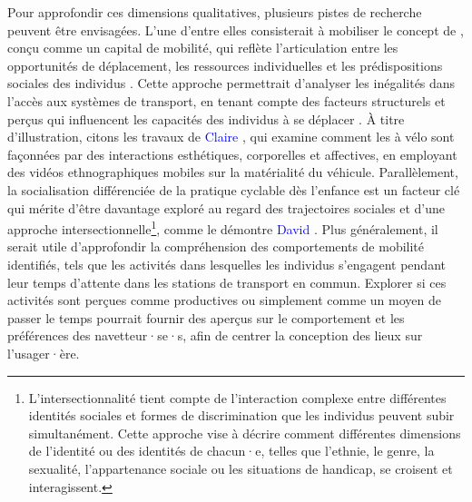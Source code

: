 \begin{refsegment}
Pour approfondir ces dimensions qualitatives, plusieurs pistes de recherche peuvent être envisagées. L'une d'entre elles consisterait à mobiliser le concept de , conçu comme un capital de mobilité, qui reflète l’articulation entre les opportunités de déplacement, les ressources individuelles et les prédispositions sociales des individus \textcolor{blue}{\autocite[750]{kaufmann_motility_2004}}. Cette approche permettrait d’analyser les inégalités dans l’accès aux systèmes de transport, en tenant compte des facteurs structurels et perçus qui influencent les capacités des individus à se déplacer \textcolor{blue}{\autocite[45]{abord_dechatillon_velo_2021}}. À titre d'illustration, citons les travaux de \textcolor{blue}{Claire} \textcolor{blue}{\textcite{pelgrims_gendered_2023}}, qui examine comment les  à vélo sont façonnées par des interactions esthétiques, corporelles et affectives, en employant des vidéos ethnographiques mobiles sur la matérialité du véhicule. Parallèlement, la socialisation différenciée de la pratique cyclable dès l’enfance est un facteur clé qui mérite d’être davantage exploré au regard des trajectoires sociales et d'une approche intersectionnelle\footnote{
    L'intersectionnalité tient compte de l'interaction complexe entre différentes identités sociales et formes de discrimination que les individus peuvent subir simultanément. Cette approche vise à décrire comment différentes dimensions de l'identité ou des identités de chacun·e, telles que l'ethnie, le genre, la sexualité, l'appartenance sociale ou les situations de handicap, se croisent et interagissent.
}, comme le démontre \textcolor{blue}{David} \textcolor{blue}{\textcite[12-16]{sayagh_adolescentes_2018}}. Plus généralement, il serait utile d'approfondir la compréhension des comportements de mobilité identifiés, tels que les activités dans lesquelles les individus s'engagent pendant leur temps d'attente dans les stations de transport en commun. Explorer si ces activités sont perçues comme productives ou simplement comme un moyen de passer le temps pourrait fournir des aperçus sur le comportement et les préférences des navetteur·se·s, afin de centrer la conception des lieux sur l'usager·ère.%


\end{refsegment}
